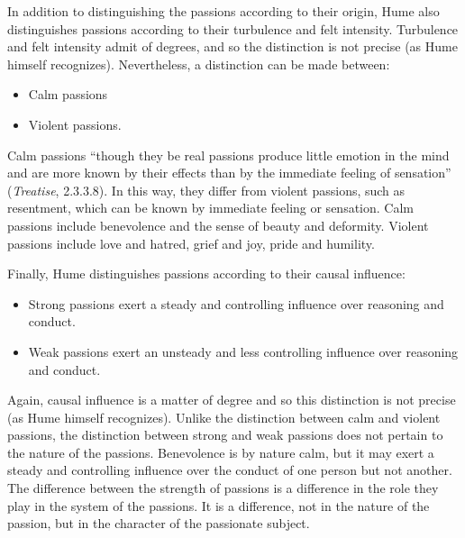 In addition to distinguishing the passions according to their origin, Hume also distinguishes passions according to their turbulence and felt intensity. Turbulence and felt intensity admit of degrees, and so the distinction is not precise (as Hume himself recognizes). Nevertheless, a distinction can be made between:

\begin{itemize}
    \item Calm passions
    \item Violent passions.
\end{itemize}

Calm passions ``though they be real passions produce little emotion in the mind and are more known by their effects than by the immediate feeling of sensation'' (\emph{Treatise}, 2.3.3.8). In this way, they differ from violent passions, such as resentment, which can be known by immediate feeling or sensation. Calm passions include benevolence and the sense of beauty and deformity. Violent passions include love and hatred, grief and joy, pride and humility. \change

Finally, Hume distinguishes passions according to their causal influence:

\begin{itemize}
    \item Strong passions exert a steady and controlling influence over reasoning and conduct.
    \item Weak passions exert an unsteady and less controlling influence over reasoning and conduct.
\end{itemize}

Again, causal influence is a matter of degree and so this distinction is not precise (as Hume himself recognizes). Unlike the distinction between calm and violent passions, the distinction between strong and weak passions does not pertain to the nature of the passions. Benevolence is by nature calm, but it may exert a steady and controlling influence over the conduct of one person but not another. The difference between the strength of passions is a difference in the role they play in the system of the passions. It is a difference, not in the nature of the passion, but in the character of the passionate subject. \change

% 

